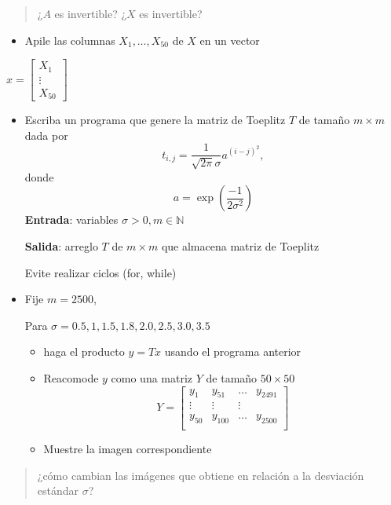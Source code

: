 \documentclass[11pt]{article}
\providecommand{\tightlist}{%
      \setlength{\itemsep}{0pt}\setlength{\parskip}{0pt}}
\begin{document}
    \begin{quote}
 ¿\(A\) es invertible? ¿\(X\) es invertible?
\end{quote}

    \begin{itemize}
\tightlist
\item
   Apile las columnas \(X_1,\dots,X_{50}\) de \(X\) en un vector
\end{itemize}

\(x= \begin{bmatrix} X_1 \\ \vdots \\ X_{50}\end{bmatrix}\) 

    \begin{itemize}
\tightlist
\item
   Escriba un programa que genere la matriz de Toeplitz \(T\) de tamaño
  \(m\times m\) dada por
  \[t_{i,j}=\dfrac{1}{\sqrt{2\pi}\sigma}a^{(i-j)^2},\] donde
  \[a=\exp\left(\dfrac{-1}{2\sigma^2}\right)\] 
  \textbf{Entrada}:
  variables \(\sigma>0,m\in\mathbb N\) 
  
  \textbf{Salida}: arreglo \(T\) de
  \(m\times m\) que almacena matriz de Toeplitz 
  
  Evite realizar ciclos (for, while)
\end{itemize}

    \begin{itemize}
\tightlist
\item
  Fije \(m=2500\), 
  
  Para \(\sigma=0.5,1,1.5,1.8,2.0,2.5,3.0,3.5\) 
  \begin{itemize}
   \item[]  haga el producto \(y =Tx\) usando el programa anterior 
   \item[] Reacomode \(y\)
    como una matriz \(Y\) de tamaño \(50\times 50\) 
     \[Y = \begin{bmatrix}
          y_1 & y_{51} & \dots & y_{2491}\\ \vdots & \vdots & \vdots \\ 
          y_{50} & y_{100} & \dots & y_ {2500}\\
          \end{bmatrix}\] 
   \item[] Muestre la imagen correspondiente
  \end{itemize}
\end{itemize}


 \begin{quote}
 ¿cómo cambian las imágenes que obtiene en relación a la desviación
estándar \(\sigma\)?
\end{quote}
\end{document}
